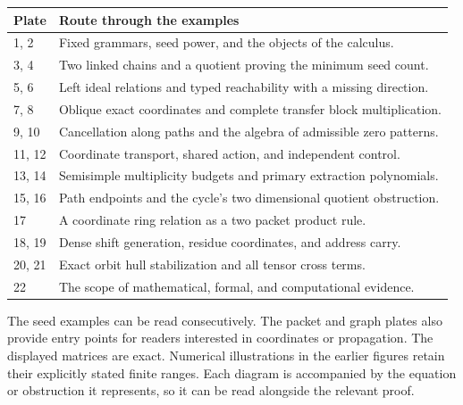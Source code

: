 \medskip
\begin{longtable}{@{}p{}p{}@{}}
\toprule Plate & Route through the examples\\\midrule\endhead
1, 2 & Fixed grammars, seed power, and the objects of the calculus.\\
3, 4 & Two linked chains and a quotient proving the minimum seed count.\\
5, 6 & Left ideal relations and typed reachability with a missing direction.\\
7, 8 & Oblique exact coordinates and complete transfer block multiplication.\\
9, 10 & Cancellation along paths and the algebra of admissible zero patterns.\\
11, 12 & Coordinate transport, shared action, and independent control.\\
13, 14 & Semisimple multiplicity budgets and primary extraction polynomials.\\
15, 16 & Path endpoints and the cycle's two dimensional quotient obstruction.\\
17 & A coordinate ring relation as a two packet product rule.\\
18, 19 & Dense shift generation, residue coordinates, and address carry.\\
20, 21 & Exact orbit hull stabilization and all tensor cross terms.\\
22 & The scope of mathematical, formal, and computational evidence.\\
\bottomrule\end{longtable}

The seed examples can be read consecutively. The packet and graph plates also provide entry points for readers interested in coordinates or propagation. The displayed matrices are exact. Numerical illustrations in the earlier figures retain their explicitly stated finite ranges. Each diagram is accompanied by the equation or obstruction it represents, so it can be read alongside the relevant proof.
\begingroup\fontsize{9.9}{11.2}\selectfont{}\setlength{\parindent}{0pt}\setlength{\parskip}{2pt}\setlength{\abovedisplayskip}{7pt}\setlength{\belowdisplayskip}{7pt}\endgroup

